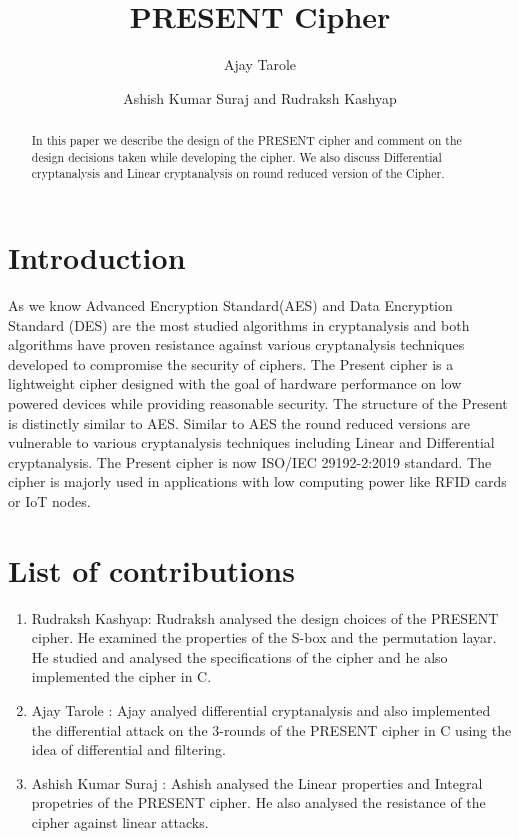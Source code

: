 \documentclass[journal=tosc,preprint]{iacrtrans}
\author{Ajay Tarole\inst{1} \and Ashish Kumar Suraj\inst{2} and Rudraksh Kashyap\inst{3}}
\institute{
  11840090, IIT Bhilai, \email{ajayt@iitbhilai.ac.in}
  \and
  1184230, IIT Bhilai, \email{ashishs@iitbhilai.ac.in}
  \and
  11840970, IIT Bhilai, \email{rudrakshk@iitbhilai.ac.in}
  
}
\title{PRESENT Cipher}
\begin{document}
\maketitle




\begin{abstract}
  In this paper we describe the design of the PRESENT cipher and comment on the design decisions taken while developing the cipher. We also discuss Differential cryptanalysis and Linear
  cryptanalysis on round reduced version of the Cipher. 
\end{abstract}


\section{Introduction}
As we know Advanced Encryption Standard(AES) and Data Encryption Standard (DES) are the most
studied algorithms in cryptanalysis and both algorithms have proven resistance against various cryptanalysis techniques developed
to compromise the security of ciphers. The Present cipher is a lightweight cipher designed with the goal of hardware
performance on low powered devices while providing reasonable security. The structure of the Present is distinctly similar to AES. Similar to AES the round
reduced versions are vulnerable to various cryptanalysis techniques including Linear and
Differential cryptanalysis. The Present
cipher is now ISO/IEC 29192-2:2019 standard. The cipher is majorly used in applications
with low computing power like RFID cards or IoT nodes. 
\section{List of contributions}
\begin{enumerate}
	\item Rudraksh Kashyap: Rudraksh analysed the design choices of the PRESENT cipher. He examined the properties of the S-box and the permutation layar. He studied and analysed the specifications of the cipher and he also implemented the cipher in C. 
	\item Ajay Tarole : Ajay analyed differential cryptanalysis and also implemented the differential attack on the 3-rounds of the PRESENT cipher in C using the idea of differential and filtering.
	\item Ashish Kumar Suraj : Ashish analysed the Linear properties and Integral propetries of the PRESENT cipher. He also analysed the resistance of the cipher against linear attacks. 
	
\end{enumerate}
\end{document}
